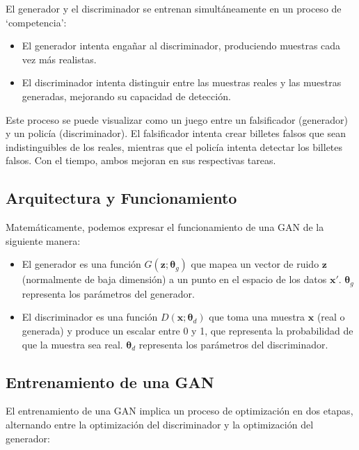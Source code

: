 \documentclass{article}
\begin{document}
El generador y el discriminador se entrenan simultáneamente en un proceso de `competencia':

\begin{itemize}
    \item El generador intenta engañar al discriminador, produciendo muestras cada vez más realistas.
    \item El discriminador intenta distinguir entre las muestras reales y las muestras generadas, mejorando su capacidad de detección.
\end{itemize}

Este proceso se puede visualizar como un juego entre un falsificador (generador) y un policía (discriminador).  El falsificador intenta crear billetes falsos que sean indistinguibles de los reales, mientras que el policía intenta detectar los billetes falsos.  Con el tiempo, ambos mejoran en sus respectivas tareas.

\subsection{Arquitectura y Funcionamiento}
Matemáticamente, podemos expresar el funcionamiento de una GAN de la siguiente manera:

\begin{itemize}
  \item El generador es una función \(G(\mathbf{z}; \boldsymbol{\theta}_g)\) que mapea un vector de ruido \(\mathbf{z}\) (normalmente de baja dimensión) a un punto en el espacio de los datos \(\mathbf{x}'\). \(\boldsymbol{\theta}_g\) representa los parámetros del generador.
   \item El discriminador es una función \(D(\mathbf{x}; \boldsymbol{\theta}_d)\) que toma una muestra \(\mathbf{x}\) (real o generada) y produce un escalar entre 0 y 1, que representa la probabilidad de que la muestra sea real.  \(\boldsymbol{\theta}_d\) representa los parámetros del discriminador.
\end{itemize}

\subsection{Entrenamiento de una GAN}

El entrenamiento de una GAN implica un proceso de optimización en dos etapas, alternando entre la optimización del discriminador y la optimización del generador:
\end{document}

